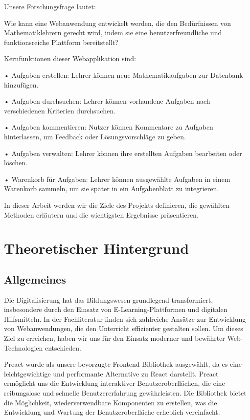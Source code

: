 \documentclass[12pt,a4paper]{article} %
\begin{document}
Unsere Forschungsfrage lautet: 

Wie kann eine Webanwendung entwickelt werden, die den Bedürfnissen von Mathematiklehrern gerecht wird, indem sie eine benutzerfreundliche und funktionsreiche Plattform bereitstellt?

Kernfunktionen dieser Webapplikation sind:

• Aufgaben erstellen: Lehrer können neue Mathematikaufgaben zur Datenbank
hinzufügen.

• Aufgaben durchsuchen: Lehrer können vorhandene Aufgaben nach verschiedenen Kriterien durchsuchen.

• Aufgaben kommentieren: Nutzer können Kommentare zu Aufgaben hinterlassen, um Feedback oder Lösungsvorschläge zu geben.

• Aufgaben verwalten: Lehrer können ihre erstellten Aufgaben bearbeiten oder löschen.

• Warenkorb für Aufgaben: Lehrer können ausgewählte Aufgaben in einem Warenkorb sammeln, um sie später in ein Aufgabenblatt zu integrieren.

In dieser Arbeit werden wir die Ziele des Projekts definieren, die gewählten Methoden erläutern und die wichtigsten Ergebnisse präsentieren. 


\section{Theoretischer Hintergrund}
\subsection{Allgemeines}
Die Digitalisierung hat das Bildungswesen grundlegend transformiert, insbesondere durch den Einsatz von E-Learning-Plattformen und digitalen Hilfsmitteln. In der Fachliteratur finden sich zahlreiche Ansätze zur Entwicklung von Webanwendungen, die den Unterricht effizienter gestalten sollen. Um dieses Ziel zu erreichen, haben wir uns für den Einsatz moderner und bewährter Web-Technologien entschieden.

Preact wurde als unsere bevorzugte Frontend-Bibliothek ausgewählt, da es eine leichtgewichtige und performante Alternative zu React darstellt. Preact ermöglicht uns die Entwicklung interaktiver Benutzeroberflächen, die eine reibungslose und schnelle Benutzererfahrung gewährleisten. Die Bibliothek bietet die Möglichkeit, wiederverwendbare Komponenten zu erstellen, was die Entwicklung und Wartung der Benutzeroberfläche erheblich vereinfacht.
\end{document}
